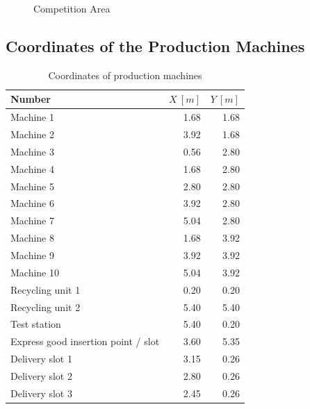 \documentclass[12pt,twoside]{article}
\begin{document}
\begin{figure}[h]
  \caption{Competition Area}
  \label{fig:competition-area}
\end{figure}



\subsection{Coordinates of the Production Machines}
\label{sec:coordinates}

\begin{table}[h]
  \centering
  \begin{tabular}{l|r|r}
    \multicolumn{1}{l}{Number} & \multicolumn{1}{l}{$X~[m]$} & \multicolumn{1}{l}{$Y~[m]$}\\ \hline
    Machine 1 & 1.68 & 1.68 \\
    Machine 2 & 3.92 & 1.68 \\
    Machine 3 & 0.56 & 2.80 \\
    Machine 4 & 1.68 & 2.80 \\
    Machine 5 & 2.80 & 2.80 \\
    Machine 6 & 3.92 & 2.80 \\
    Machine 7 & 5.04 & 2.80 \\
    Machine 8 & 1.68 & 3.92 \\
    Machine 9 & 3.92 & 3.92 \\
    Machine 10 & 5.04 & 3.92 \\
    Recycling unit 1 & 0.20 & 0.20 \\
    Recycling unit 2 & 5.40 & 5.40 \\
    Test station &	5.40  &0.20 \\
    Express good insertion point / slot & 	3.60 & 	5.35 \\
    Delivery slot 1 & 	3.15 & 0.26 \\
    Delivery slot 2 &	2.80 & 0.26 \\ 
    Delivery slot 3 &	2.45 & 0.26 \\\hline
  \end{tabular}

  \caption{Coordinates of production machines}
  \label{tab:coordinates}
\end{table}
\end{document}
